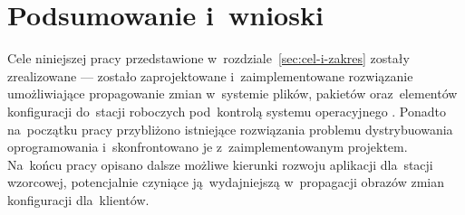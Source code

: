 \documentclass[thesis]{subfiles}
\begin{document}
%


\section{Podsumowanie i~wnioski}

Cele niniejszej pracy przedstawione w~rozdziale~\ref{sec:cel-i-zakres} zostały zrealizowane --- zostało zaprojektowane i~zaimplementowane rozwiązanie umożliwiające propagowanie zmian w~systemie plików, pakietów oraz~elementów konfiguracji do~stacji roboczych pod~kontrolą systemu operacyjnego . Ponadto na~początku pracy przybliżono istniejące rozwiązania problemu dystrybuowania oprogramowania i~skonfrontowano je z~zaimplementowanym projektem. Na~końcu pracy opisano dalsze możliwe kierunki rozwoju aplikacji \texttt{\srvappname{}} dla~stacji wzorcowej, potencjalnie czyniące ją~wydajniejszą w~propagacji obrazów zmian konfiguracji dla~klientów.
\end{document}
